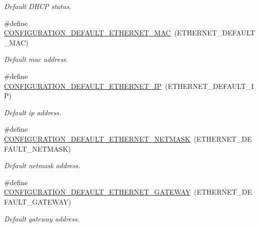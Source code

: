 \begin{DoxyCompactItemize}
\begin{DoxyCompactList}\small\item\em Default D\+H\+CP status. \end{DoxyCompactList}\item 
\mbox{\label{rmap-config_8h_a5333d2c3bcda84cc19a56f3ab7a2bcce}} 
\#define \hyperlink{rmap-config_8h_a5333d2c3bcda84cc19a56f3ab7a2bcce}{C\+O\+N\+F\+I\+G\+U\+R\+A\+T\+I\+O\+N\+\_\+\+D\+E\+F\+A\+U\+L\+T\+\_\+\+E\+T\+H\+E\+R\+N\+E\+T\+\_\+\+M\+AC}~(E\+T\+H\+E\+R\+N\+E\+T\+\_\+\+D\+E\+F\+A\+U\+L\+T\+\_\+\+M\+AC)
\begin{DoxyCompactList}\small\item\em Default mac address. \end{DoxyCompactList}\item 
\mbox{\label{rmap-config_8h_ae03d41374839792a8b5585ebf9bdcd3b}} 
\#define \hyperlink{rmap-config_8h_ae03d41374839792a8b5585ebf9bdcd3b}{C\+O\+N\+F\+I\+G\+U\+R\+A\+T\+I\+O\+N\+\_\+\+D\+E\+F\+A\+U\+L\+T\+\_\+\+E\+T\+H\+E\+R\+N\+E\+T\+\_\+\+IP}~(E\+T\+H\+E\+R\+N\+E\+T\+\_\+\+D\+E\+F\+A\+U\+L\+T\+\_\+\+IP)
\begin{DoxyCompactList}\small\item\em Default ip address. \end{DoxyCompactList}\item 
\mbox{\label{rmap-config_8h_a6e0029e4ba852ab74d69263d934c7160}} 
\#define \hyperlink{rmap-config_8h_a6e0029e4ba852ab74d69263d934c7160}{C\+O\+N\+F\+I\+G\+U\+R\+A\+T\+I\+O\+N\+\_\+\+D\+E\+F\+A\+U\+L\+T\+\_\+\+E\+T\+H\+E\+R\+N\+E\+T\+\_\+\+N\+E\+T\+M\+A\+SK}~(E\+T\+H\+E\+R\+N\+E\+T\+\_\+\+D\+E\+F\+A\+U\+L\+T\+\_\+\+N\+E\+T\+M\+A\+SK)
\begin{DoxyCompactList}\small\item\em Default netmask address. \end{DoxyCompactList}\item 
\mbox{\label{rmap-config_8h_adb31ecf5d2e45dab1b0508a21313267b}} 
\#define \hyperlink{rmap-config_8h_adb31ecf5d2e45dab1b0508a21313267b}{C\+O\+N\+F\+I\+G\+U\+R\+A\+T\+I\+O\+N\+\_\+\+D\+E\+F\+A\+U\+L\+T\+\_\+\+E\+T\+H\+E\+R\+N\+E\+T\+\_\+\+G\+A\+T\+E\+W\+AY}~(E\+T\+H\+E\+R\+N\+E\+T\+\_\+\+D\+E\+F\+A\+U\+L\+T\+\_\+\+G\+A\+T\+E\+W\+AY)
\begin{DoxyCompactList}\small\item\em Default gateway address. \end{DoxyCompactList}\item 

\end{DoxyCompactItemize}
